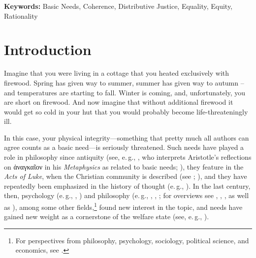 \documentclass[egregdoesnotlikesansseriftitles]{scrartcl}
\begin{document}
\noindent\textbf{Keywords:} Basic Needs, Coherence, Distributive Justice, Equality, Equity, Rationality


\renewcommand{\thefootnote}{\arabic{footnote}}\setcounter{footnote}{0}
\newpage


\section{Introduction}\label{sec:introduction}
Imagine that you were living in a cottage that you heated exclusively with firewood.
Spring has given way to summer, summer has given way to autumn – and temperatures are starting to fall.
Winter is coming, and, unfortunately, you are short on firewood.
And now imagine that without additional firewood it would get so cold in your hut that you would probably become life-threateningly ill.

In this case, your physical integrity---something that pretty much all authors can agree counts as a basic need---is seriously threatened.
Such needs have played a role in philosophy since antiquity (see, e.\,g., \citealt{poelzler_basic_2021}, who interprets Aristotle's reflections on \textgreek{ἀναγκαῖον} in his \textit{Metaphysics} as related to basic needs; \citealt[1015a20--1015b15]{aristotle_metaphysics_1933}), they feature in the \textit{Acts of Luke}, when the Christian community is described (see \citealt[p. 302f.]{bauer_gerechtigkeit_2019}; \citealt[p. 141f.]{luke_apostelgeschichte_2016}), and they have repeatedly been emphasized in the history of thought (e.\,g., \citealt{marx_kritik_1969}). In the last century, then, psychology (e.\,g., \citealt{maslow_theory_1943}, \citealt{alderfer_existence_1972}) and philosophy (e.\,g., \citealt{thomson_need_1987}, \citealt{miller_principles_1999}, \citealt{hamilton_political_2003}; for overviews see \citealt{brock_needs_2019}, \citealt{miller_needs_2020}, \citealt{siebel_need-based_2020}, as well as \citealt{poelzler_basic_2021}), among some other fields,\footnote{For perspectives from philosophy, psychology, sociology, political science, and economics, see \cite{kittel_need-based_2020}.} found new interest in the topic, and needs have gained new weight as a cornerstone of the welfare state (see, e.\,g., \citealt{esping-andersen_three_1990}).
\end{document}
